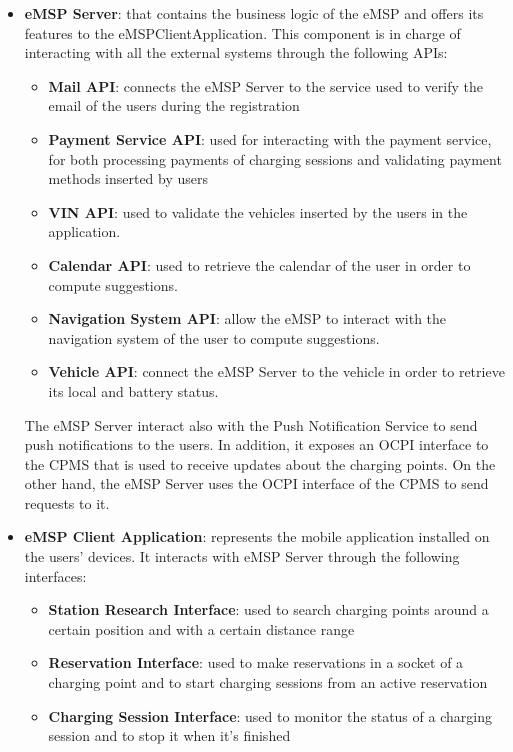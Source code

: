 \documentclass{Configuration_Files/PoliMi3i_thesis}
\begin{document}
\begin{itemize}
    \item \textbf{eMSP Server}: that contains the business logic of the eMSP and offers its features to the eMSPClientApplication. This component is in charge of interacting with all the external systems through the following APIs:
        \begin{itemize}
            \item \textbf{Mail API}: connects the eMSP Server to the service used to verify the email of the users during the registration
            \item \textbf{Payment Service API}: used for interacting with the payment service, for both processing payments of charging sessions and validating payment methods inserted by users
            \item \textbf{VIN API}: used to validate the vehicles inserted by the users in the application.
            \item \textbf{Calendar API}: used to retrieve the calendar of the user in order to compute suggestions.
            \item \textbf{Navigation System API}: allow the eMSP to interact with the navigation system of the user to compute suggestions.
            \item \textbf{Vehicle API}: connect the eMSP Server to the vehicle in order to retrieve its local and battery status.
        \end{itemize}
    The eMSP Server interact also with the Push Notification Service to send push notifications to the users. In addition, it exposes an OCPI interface to the CPMS that is used to receive updates about the charging points. On the other hand, the eMSP Server uses the OCPI interface of the CPMS to send requests to it.
    \item \textbf{eMSP Client Application}: represents the mobile application installed on the users' devices. It interacts with eMSP Server through the following interfaces:
        \begin{itemize}
            \item \textbf{Station Research Interface}: used to search charging points around a certain position and with a certain distance range
            \item \textbf{Reservation Interface}: used to make reservations in a socket of a charging point and to start charging sessions from an active reservation
            \item \textbf{Charging Session Interface}: used to monitor the status of a charging session and to stop it when it's finished

\end{itemize}
\end{itemize}
\end{document}
